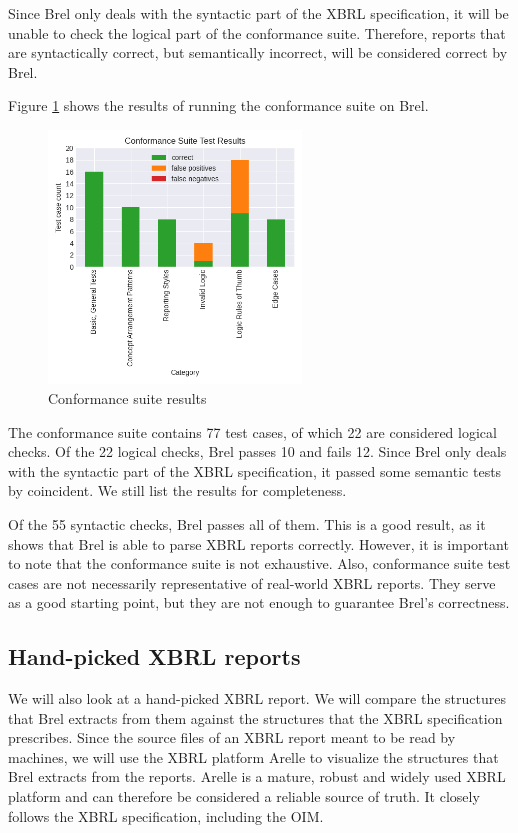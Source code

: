Since Brel only deals with the syntactic part of the XBRL specification, 
it will be unable to check the logical part of the conformance suite.
Therefore, reports that are syntactically correct, but semantically incorrect, will be considered correct by Brel.

Figure \ref{fig:conformance_suite} shows the results of running the conformance suite on Brel.

\begin{figure}[H]
  \centering
  \includegraphics[width=0.6\textwidth]{images/seattle_method_test_results.png}
    \caption{Conformance suite results}
    \label{fig:conformance_suite}
\end{figure}

The conformance suite contains 77 test cases, of which 22 are considered logical checks.
Of the 22 logical checks, Brel passes 10 and fails 12.
Since Brel only deals with the syntactic part of the XBRL specification,
it passed some semantic tests by coincident.
We still list the results for completeness.

Of the 55 syntactic checks, Brel passes all of them.
This is a good result, as it shows that Brel is able to parse XBRL reports correctly.
However, it is important to note that the conformance suite is not exhaustive.
Also, conformance suite test cases are not necessarily representative of real-world XBRL reports.
They serve as a good starting point, but they are not enough to guarantee Brel's correctness.

\subsection{Hand-picked XBRL reports}

We will also look at a hand-picked XBRL report.
We will compare the structures that Brel extracts from them against the structures that the XBRL specification prescribes.
Since the source files of an XBRL report meant to be read by machines,
we will use the XBRL platform Arelle to visualize the structures that Brel extracts from the reports.
Arelle is a mature, robust and widely used XBRL platform and can therefore be considered a reliable source of truth.
It closely follows the XBRL specification, including the OIM.


